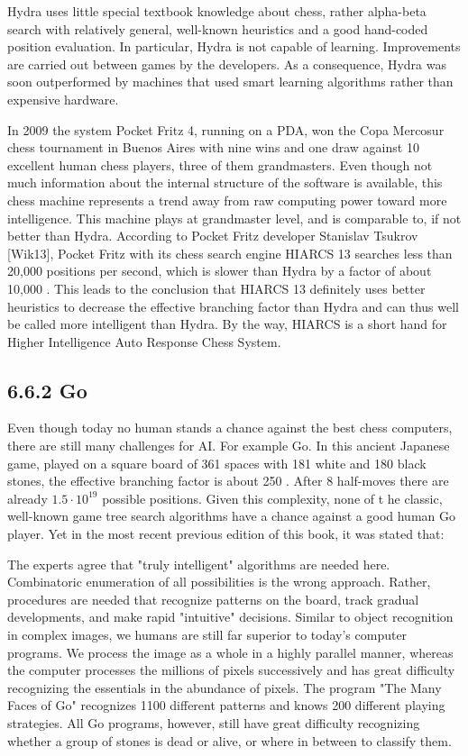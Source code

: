 \documentclass[10pt]{article}
\begin{document}
Hydra uses little special textbook knowledge about chess, rather alpha-beta search with relatively general, well-known heuristics and a good hand-coded\\
position evaluation. In particular, Hydra is not capable of learning. Improvements are carried out between games by the developers. As a consequence, Hydra was soon outperformed by machines that used smart learning algorithms rather than expensive hardware.

In 2009 the system Pocket Fritz 4, running on a PDA, won the Copa Mercosur chess tournament in Buenos Aires with nine wins and one draw against 10 excellent human chess players, three of them grandmasters. Even though not much information about the internal structure of the software is available, this chess machine represents a trend away from raw computing power toward more intelligence. This machine plays at grandmaster level, and is comparable to, if not better than Hydra. According to Pocket Fritz developer Stanislav Tsukrov [Wik13], Pocket Fritz with its chess search engine HIARCS 13 searches less than 20,000 positions per second, which is slower than Hydra by a factor of about 10,000 . This leads to the conclusion that HIARCS 13 definitely uses better heuristics to decrease the effective branching factor than Hydra and can thus well be called more intelligent than Hydra. By the way, HIARCS is a short hand for Higher Intelligence Auto Response Chess System.

\subsection*{6.6.2 Go}
Even though today no human stands a chance against the best chess computers, there are still many challenges for AI. For example Go. In this ancient Japanese game, played on a square board of 361 spaces with 181 white and 180 black stones, the effective branching factor is about 250 . After 8 half-moves there are already $1.5 \cdot 10^{19}$ possible positions. Given this complexity, none of t
he classic, well-known game tree search algorithms have a chance against a good human Go player. Yet in the most recent previous edition of this book, it was stated that:

\begin{displayquote}
The experts agree that "truly intelligent" algorithms are needed here. Combinatoric enumeration of all possibilities is the wrong approach. Rather, procedures are needed that recognize patterns on the board, track gradual developments, and make rapid "intuitive" decisions. Similar to object recognition in complex images, we humans are still far superior to today's computer programs. We process the image as a whole in a highly parallel manner, whereas the computer processes the millions of pixels successively and has great difficulty recognizing the essentials in the abundance of pixels. The program "The Many Faces of Go" recognizes 1100 different patterns and knows 200 different playing strategies. All Go programs, however, still have great difficulty recognizing whether a group of stones is dead or alive, or where in between to classify them.
\end{displayquote}
\end{document}

